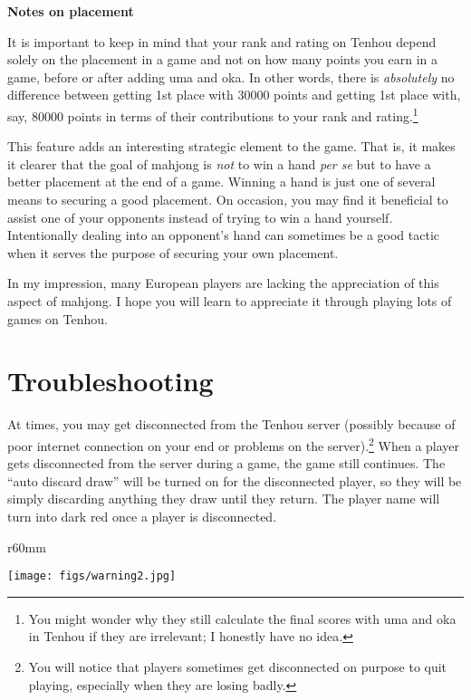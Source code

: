 \begin{boxnote} \small
{\bf\normalsize Notes on placement}

\bigskip
It is important to keep in mind that your rank and rating on {\jap Tenhou} depend solely on the placement in a game and not on how many points you earn in a game, before or after adding {\jap uma} and {\jap oka}. In other words, there is \emph{absolutely} no difference between getting 1st place with 30000 points and getting 1st place with, say, 80000 points in terms of their contributions to your rank and rating.\footnote{You might wonder why they still calculate the final scores with {\jap uma} and {\jap oka} in {\jap Tenhou} if they are irrelevant; I honestly have no idea.}

\bigskip
This feature adds an interesting strategic element to the game. That is, it makes it clearer that the goal of mahjong is \emph{not} to win a hand \emph{per se} but to have a better placement at the end of a game. Winning a hand is just one of several means to securing a good placement. On occasion, you may find it beneficial to assist one of your opponents instead of trying to win a hand yourself. Intentionally dealing into an opponent's hand can sometimes be a good tactic when it serves the purpose of securing your own placement. 

\bigskip
In my impression, many European players are lacking the appreciation of this aspect of mahjong. I hope you will learn to appreciate it through playing lots of games on {\jap Tenhou}.
\vspace{5pt}
\end{boxnote}

\newpage
\section{Troubleshooting}

At times, you may get disconnected from the {\jap Tenhou} server (possibly because of poor internet connection on your end or problems on the server).\footnote{You will notice that players sometimes get disconnected on purpose to quit playing, especially when they are losing badly.}
When a player gets disconnected from the server during a game, the game still continues. The ``auto discard draw'' will be turned on for the disconnected player, so they will be simply discarding anything they draw until they return. The player name will turn into dark red once a player is disconnected. 

\begin{wrapfigure}{r}{60mm}
\vspace{-10pt}
\begin{center}
\texttt{[image: figs/warning2.jpg]}
\end{center}
\vspace{-10pt}
\end{wrapfigure}


